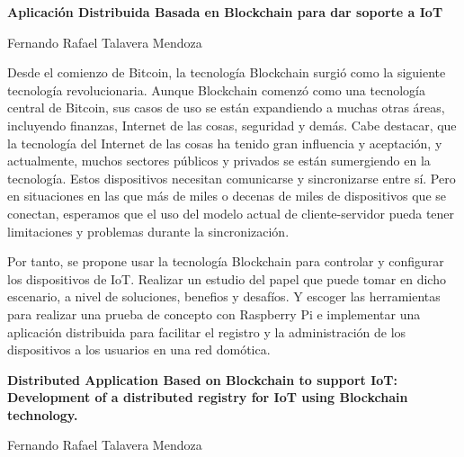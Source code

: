 \myemptypage


\myemptypage
\thispagestyle{empty}

\begin{center}
{\large\bfseries Aplicación Distribuida Basada en Blockchain para dar soporte a IoT}\\
\end{center}
\begin{center}
Fernando Rafael Talavera Mendoza\\
\end{center}


\vspace{0.7cm}

\vspace{5mm}

Desde el comienzo de Bitcoin, la tecnología Blockchain surgió como la siguiente tecnología revolucionaria. 
Aunque Blockchain comenzó como una tecnología central de Bitcoin, sus casos de uso se están expandiendo a 
muchas otras áreas, incluyendo finanzas, Internet de las cosas, seguridad y demás. Cabe destacar, que la 
tecnología del Internet de las cosas ha tenido gran influencia y aceptación, y actualmente, muchos sectores 
públicos y privados se están sumergiendo en la tecnología. Estos dispositivos necesitan comunicarse y 
sincronizarse entre sí. Pero en situaciones en las que más de miles o decenas de miles de dispositivos que se 
conectan, esperamos que el uso del modelo actual de cliente-servidor pueda tener limitaciones y problemas 
durante la sincronización. 

\vspace{5mm}

\noindent Por tanto, se propone usar la tecnología Blockchain para controlar y configurar los dispositivos 
de IoT. Realizar un estudio del papel que puede tomar en dicho escenario, a nivel de soluciones, benefios 
y desafíos. Y escoger las herramientas para realizar una prueba de concepto con Raspberry Pi e implementar
una aplicación distribuida para facilitar el registro y la administración de los dispositivos a los 
usuarios en una red domótica.

\newpage
\thispagestyle{empty}

\begin{center}
{\large\bfseries Distributed Application Based on Blockchain to support IoT: Development of a distributed registry for 
IoT using Blockchain technology.}\\
\end{center}
\begin{center}
Fernando Rafael Talavera Mendoza\\
\end{center}

